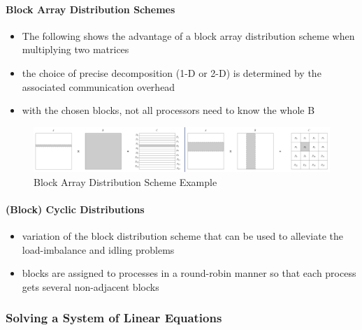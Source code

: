\clearpage
\hypertarget{block-array-distribution-schemes}{%
\paragraph{Block Array Distribution
Schemes}\label{block-array-distribution-schemes}}

\begin{itemize}
\tightlist
\item
  The following shows the advantage of a block array distribution scheme
  when multiplying two matrices
\item
  the choice of precise decomposition (1-D or 2-D) is determined by the
  associated communication overhead
\item
  with the chosen blocks, not all processors need to know the whole B
\end{itemize}

\begin{figure}[H]
\centering
\includegraphics[width=1\textwidth]{figures/blockdistributionscheme.png}
\caption{Block Array Distribution Scheme Example}
\end{figure}

\hypertarget{block-cyclic-distributions}{%
\paragraph{(Block) Cyclic
Distributions}\label{block-cyclic-distributions}}

\begin{itemize}
\tightlist
\item
  variation of the block distribution scheme that can be used to
  alleviate the load-imbalance and idling problems
\item
  blocks are assigned to processes in a round-robin manner so that each
  process gets several non-adjacent blocks
\end{itemize}

\hypertarget{solving-a-system-of-linear-equations}{%
\subsubsection{Solving a System of Linear
Equations}\label{solving-a-system-of-linear-equations}}

